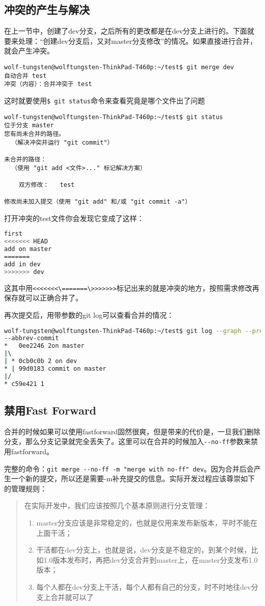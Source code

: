 \documentclass[UTF8]{ctexart}
\newenvironment{myquote}
  {\begin{quote}\kaishu\zihao{-5}}
  {\end{quote}}
\begin{document}
\subsection{冲突的产生与解决}
在上一节中，创建了dev分支，之后所有的更改都是在dev分支上进行的。下面就要来处理：“创建dev分支后，又对master分支修改”的情况。如果直接进行合并，就会产生冲突。
\begin{lstlisting}
wolf-tungsten@wolftungsten-ThinkPad-T460p:~/test$ git merge dev
自动合并 test
冲突（内容）：合并冲突于 test
\end{lstlisting}
这时就要使用\verb!$ git status!命令来查看究竟是哪个文件出了问题

\begin{lstlisting}
wolf-tungsten@wolftungsten-ThinkPad-T460p:~/test$ git status
位于分支 master
您有尚未合并的路径。
  （解决冲突并运行 "git commit"）

未合并的路径：
  （使用 "git add <文件>..." 标记解决方案）

	双方修改：   test

修改尚未加入提交（使用 "git add" 和/或 "git commit -a"）
\end{lstlisting}
打开冲突的test文件你会发现它变成了这样：
\begin{lstlisting}[language=bash]
first
<<<<<<< HEAD
add on master
=======
add in dev
>>>>>>> dev
\end{lstlisting}
这其中用\verb!<<<<<<<\=======\>>>>>>>!标记出来的就是冲突的地方，按照需求修改再保存就可以正确合并了。

再次提交后，用带参数的git log可以查看合并的情况：
\begin{lstlisting}[language=bash]
wolf-tungsten@wolftungsten-ThinkPad-T460p:~/test$ git log --graph --pretty=oneline 
--abbrev-commit
*   0ee2246 2on master
|\  
| * 0cb0c0b 2 on dev
* | 99d0183 commit on master
|/  
* c59e421 1
\end{lstlisting}
\subsection{禁用Fast Forward}
合并的时候如果可以使用fastforward固然很爽，但是带来的代价是，一旦我们删除分支，那么分支记录就完全丢失了。这里可以在合并的时候加入\verb！--no-ff！参数来禁用fastforward。

完整的命令：\verb!git merge --no-ff -m "merge with no-ff" dev!。因为合并后会产生一个新的提交，所以还是需要-m补充提交的信息。实际开发过程应该尊崇如下的管理规则：
\begin{myquote}
在实际开发中，我们应该按照几个基本原则进行分支管理：
\begin{enumerate}
\item master分支应该是非常稳定的，也就是仅用来发布新版本，平时不能在上面干活；
\item 干活都在dev分支上，也就是说，dev分支是不稳定的，到某个时候，比如1.0版本发布时，再把dev分支合并到master上，在master分支发布1.0版本；
\item 每个人都在dev分支上干活，每个人都有自己的分支，时不时地往dev分支上合并就可以了
\end{enumerate}
\end{myquote}
\end{document}
